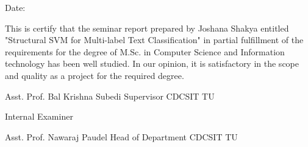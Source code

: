 \vspace{1cm}

\begin{flushright}
Date: \dottedline{4cm}
\end{flushright}

\vspace{1cm}

This is certify that the seminar report prepared by Joshana Shakya entitled "Structural SVM for Multi-label Text Classification" in partial fulfillment of the requirements for the degree of M.Sc. in Computer Science and Information technology has been well studied. In our opinion, it is satisfactory in the scope and quality as a project for the required degree. 

\vspace{2cm}

\begin{flushleft}
\dottedline{5.8cm} \newline
Asst. Prof. Bal Krishna Subedi \newline
Supervisor \newline
CDCSIT \newline
TU \newline
\end{flushleft}

\vspace{2cm}

\begin{flushleft}
\dottedline{5.8cm} \newline
Internal Examiner
\end{flushleft}

\vspace{2cm}

\begin{flushleft}
\dottedline{5.8cm} \newline       
Asst. Prof. Nawaraj Paudel \newline
Head of Department
CDCSIT \newline
TU \newline
\end{flushleft}

\clearpage
